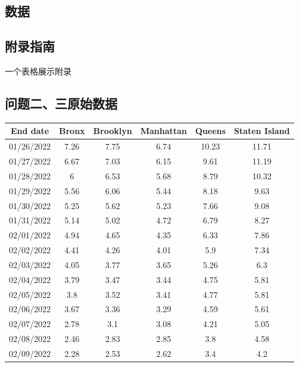 \documentclass[withoutpreface,bwprint]{cumcmthesis} %
\begin{document}
\newpage



\begin{appendices}
\section{数据}
\subsection{附录指南}
一个表格展示附录

\subsection{问题二、三原始数据}
\begin{center}
\begin{longtable}{c|ccccc}
\toprule
End date   & Bronx & Brooklyn & Manhattan & Queens & Staten Island \\
\midrule
01/26/2022 & 7.26  & 7.75     & 6.74      & 10.23  & 11.71         \\
01/27/2022 & 6.67  & 7.03     & 6.15      & 9.61   & 11.19         \\
01/28/2022 & 6     & 6.53     & 5.68      & 8.79   & 10.32         \\
01/29/2022 & 5.56  & 6.06     & 5.44      & 8.18   & 9.63          \\
01/30/2022 & 5.25  & 5.62     & 5.23      & 7.66   & 9.08          \\
01/31/2022 & 5.14  & 5.02     & 4.72      & 6.79   & 8.27          \\
02/01/2022 & 4.94  & 4.65     & 4.35      & 6.33   & 7.86          \\
02/02/2022 & 4.41  & 4.26     & 4.01      & 5.9    & 7.34          \\
02/03/2022 & 4.05  & 3.77     & 3.65      & 5.26   & 6.3           \\
02/04/2022 & 3.79  & 3.47     & 3.44      & 4.75   & 5.81          \\
02/05/2022 & 3.8   & 3.52     & 3.41      & 4.77   & 5.81          \\
02/06/2022 & 3.67  & 3.36     & 3.29      & 4.59   & 5.61          \\
02/07/2022 & 2.78  & 3.1      & 3.08      & 4.21   & 5.05          \\
02/08/2022 & 2.46  & 2.83     & 2.85      & 3.8    & 4.58          \\
02/09/2022 & 2.28  & 2.53     & 2.62      & 3.4    & 4.2           \\

\end{longtable}
\end{center}
\end{appendices}
\end{document}
